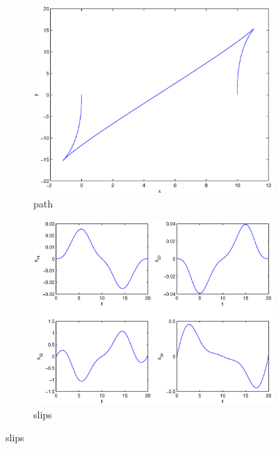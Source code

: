 \begin{figure}
\begin{subfigure}[b]{\textwidth}
\centering
\includegraphics[height=0.3\textheight]{img/final_1_15_20_path.eps}
\caption{path}
\end{subfigure}

\begin{subfigure}[b]{\textwidth}
\centering
\includegraphics[height=0.3\textheight]{img/final_1_15_20_slips.eps}
\caption{slips}
\end{subfigure}


\end{figure}
